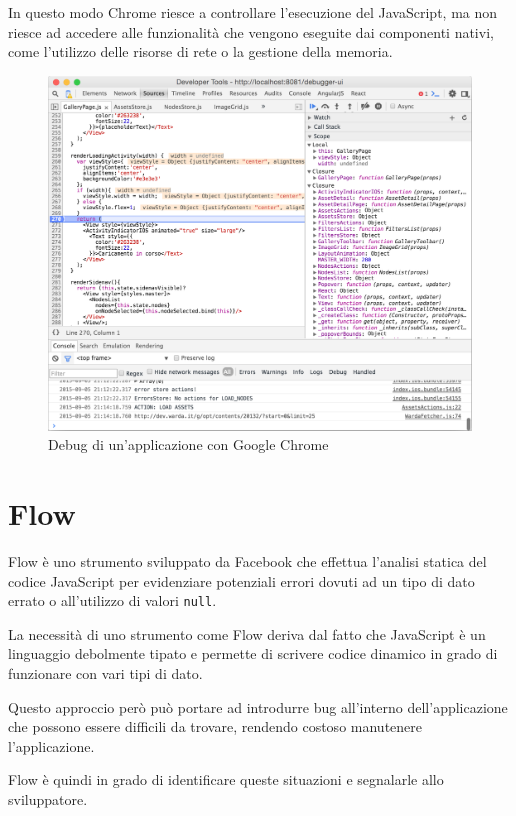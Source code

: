 In questo modo Chrome riesce a controllare l'esecuzione del JavaScript, ma non riesce ad accedere alle funzionalità che vengono eseguite dai componenti nativi, come l'utilizzo delle risorse di rete o la gestione della memoria.

\begin{figure}[htp]
\centering
\includegraphics[width=\textwidth]{../immagini/chrome-tools}
\caption{Debug di un'applicazione con Google Chrome}  
\end{figure}
\FloatBarrier

\section{Flow}

Flow è uno strumento sviluppato da Facebook che effettua l'analisi statica del codice JavaScript per evidenziare potenziali errori dovuti ad un tipo di dato errato o all'utilizzo di valori \texttt{null}.

La necessità di uno strumento come Flow deriva dal fatto che JavaScript è un linguaggio debolmente tipato e permette di scrivere codice dinamico in grado di funzionare con vari tipi di dato.

Questo approccio però può portare ad introdurre bug all'interno dell'applicazione che possono essere difficili da trovare, rendendo costoso manutenere l'applicazione.

Flow è quindi in grado di identificare queste situazioni e segnalarle allo sviluppatore.

